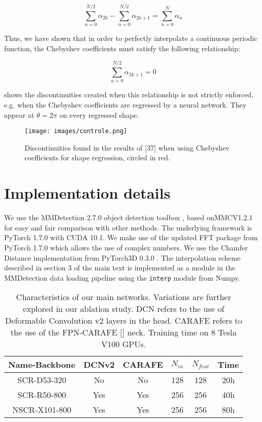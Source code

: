 \documentclass[10pt,twocolumn]{article}
\begin{document}
\begin{equation}
    \sum_{n=0}^{N/2} \alpha_{2k} - \sum_{n=0}^{N/2} \alpha_{2k+1} = \sum_{n=0}^{N} \alpha_{n} 
\end{equation}

Thus, we have shown that in order to perfectly interpolate
a continuous periodic function, the Chebyshev coefficients
must satisfy the following relationship:

\begin{equation}
    \sum_{n=0}^{N/2} \alpha_{2k+1} = 0
\end{equation}

 shows the discontinuities created when this relationship
is not strictly enforced, e.g. when the Chebyshev
coefficients are regressed by a neural network. They appear
at $\theta = 2 \pi$ on every regressed shape.

\begin{figure}[H]
    \centering
    \texttt{[image: images/controle.png]}
    \caption{Discontinuities found in the results of [37] when using
Chebyshev coefficients for shape regression, circled in red.}
    \label{fig:fig7}
\end{figure}


\section{Implementation details}

We use the MMDetection 2.7.0 object detection toolbox
\cite{chen2019mmdetection}  , based onMMCV1.2.1 for easy and fair comparison
with other methods. The underlying framework is PyTorch
1.7.0 with CUDA 10.1. We make use of the updated FFT
package from PyTorch 1.7.0 which allows the use of complex
numbers. We use the Chamfer Distance implementation
from PyTorch3D 0.3.0 \cite{ravi2020accelerating}. The interpolation scheme
described in section 3 of the main text is implemented as a
module in the MMDetection data loading pipeline using the
\texttt{interp} module from Numpy.

\begin{table}[H]
    \centering
    \begin{tabular}{c|c|c|c|c|c}
         Name-Backbone & DCNv2 & CARAFE & $N_{in}$  & $N_{feat}$ & Time \\
         \hline
         SCR-D53-320 & No & No & 128 & 128 & 20h \\
         SCR-R50-800 & Yes & Yes & 256 & 256 & 40h \\
         NSCR-X101-800 &  Yes &  Yes &  256 &  256 & 80h \\
    \end{tabular}
    \caption{Characteristics of our main networks. Variations are further
explored in our ablation study. DCN refers to the use of Deformable
Convolution v2 \cite{zhu2019deformable} layers in the head. CARAFE refers
to the use of the FPN-CARAFE [] neck. Training time on 8
Tesla V100 GPUs.}
    \label{tab:tabl}
\end{table}
\end{document}
